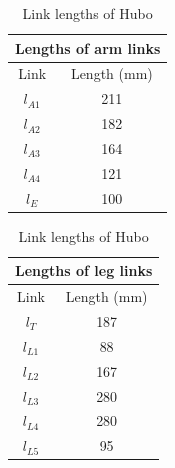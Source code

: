 \documentclass[letterpaper, 10 pt, conference]{IEEEtran}
\begin{document}
\begin{table}[h] 
    \centering
    \caption{Link lengths of Hubo}
    \begin{tabular}{|c|c|} \hline
    \multicolumn{2}{|c|}{Lengths of arm links} \\ \hline
    	Link &  Length (mm) \\ \hline
		$l_{A1}$ & 211 \\ \hline %
    	$l_{A2}$ & 182 \\ \hline %
   	    $l_{A3}$ & 164 \\ \hline %
    	$l_{A4}$ & 121 \\ \hline %
    	$l_{E}$ & 100 \\ \hline %
    \end{tabular}
    \begin{tabular}{|c|c|} \hline
    \multicolumn{2}{|c|}{Lengths of leg links} \\ \hline
    	Link &  Length (mm) \\ \hline
    	$l_{T}$ & 187 \\ \hline %
    	$l_{L1}$ & 88 \\ \hline %
    	$l_{L2}$ & 167 \\ \hline %
    	$l_{L3}$ & 280 \\ \hline %
    	$l_{L4}$ & 280 \\ \hline %
    	$l_{L5}$ & 95 \\ \hline %
    \end{tabular} \label{tbl:linkLengths}
\end{table}
\end{document}

